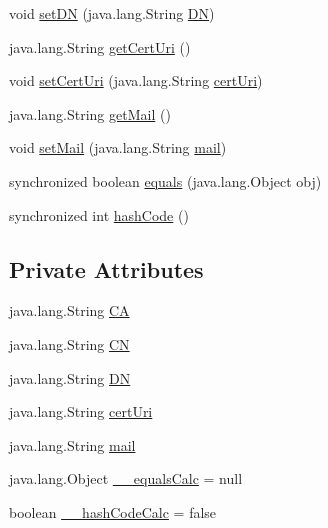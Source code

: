 \begin{DoxyCompactItemize}
void \hyperlink{classorg_1_1glite_1_1security_1_1voms_1_1User_a86ae4f2c37cfdcd5e3000a873c0dcb65}{setDN} (java.lang.String \hyperlink{classorg_1_1glite_1_1security_1_1voms_1_1User_aa572a6fe0e875ec244c516a958d7a8e8}{DN})
\item 
java.lang.String \hyperlink{classorg_1_1glite_1_1security_1_1voms_1_1User_a517f19dcd2c3045bf95650b39cde309f}{getCertUri} ()
\item 
void \hyperlink{classorg_1_1glite_1_1security_1_1voms_1_1User_af6806f4fcf024584482bb58488db3669}{setCertUri} (java.lang.String \hyperlink{classorg_1_1glite_1_1security_1_1voms_1_1User_ae03c742ad5450dd97e611fa42eca5fb0}{certUri})
\item 
java.lang.String \hyperlink{classorg_1_1glite_1_1security_1_1voms_1_1User_aa666d2f294debc95a3fca089bc8bad35}{getMail} ()
\item 
void \hyperlink{classorg_1_1glite_1_1security_1_1voms_1_1User_a62492cbee434773882cdd34dbe9e397c}{setMail} (java.lang.String \hyperlink{classorg_1_1glite_1_1security_1_1voms_1_1User_a0929e9a6327b46a6196fd741c8d5d09c}{mail})
\item 
synchronized boolean \hyperlink{classorg_1_1glite_1_1security_1_1voms_1_1User_aa36b3928ec5e5fd3b305932cec7d0e7c}{equals} (java.lang.Object obj)
\item 
synchronized int \hyperlink{classorg_1_1glite_1_1security_1_1voms_1_1User_a5b2376e733b0794a9e447424048c885e}{hashCode} ()
\end{DoxyCompactItemize}
\subsection*{Private Attributes}
\begin{DoxyCompactItemize}
\item 
java.lang.String \hyperlink{classorg_1_1glite_1_1security_1_1voms_1_1User_ac2357750b9b3d578955367ff914b07db}{CA}
\item 
java.lang.String \hyperlink{classorg_1_1glite_1_1security_1_1voms_1_1User_a21fdc685617e5e8e93eb94323986a57c}{CN}
\item 
java.lang.String \hyperlink{classorg_1_1glite_1_1security_1_1voms_1_1User_aa572a6fe0e875ec244c516a958d7a8e8}{DN}
\item 
java.lang.String \hyperlink{classorg_1_1glite_1_1security_1_1voms_1_1User_ae03c742ad5450dd97e611fa42eca5fb0}{certUri}
\item 
java.lang.String \hyperlink{classorg_1_1glite_1_1security_1_1voms_1_1User_a0929e9a6327b46a6196fd741c8d5d09c}{mail}
\item 
java.lang.Object \hyperlink{classorg_1_1glite_1_1security_1_1voms_1_1User_a3db70b6c4abd628977a6b9a326c27ef8}{\_\-\_\-equalsCalc} = null
\item 
boolean \hyperlink{classorg_1_1glite_1_1security_1_1voms_1_1User_ab45ac1303077df637c51e2dc3a03639b}{\_\-\_\-hashCodeCalc} = false
\end{DoxyCompactItemize}


